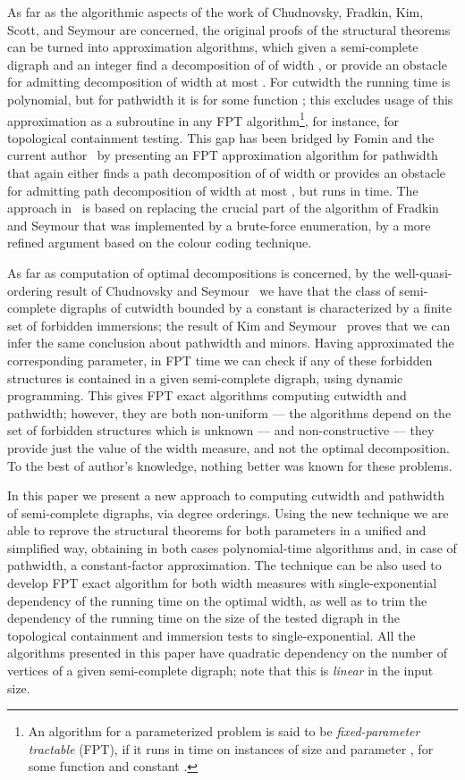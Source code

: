 \documentclass[a4paper,10pt]{article}
\begin{document}
As far as the algorithmic aspects of the work of Chudnovsky, Fradkin, Kim, Scott, and Seymour are concerned, the original proofs of the structural theorems can be turned into approximation algorithms, which given a semi-complete digraph  and an integer  find a decomposition of  of width , or provide an obstacle for admitting decomposition of width at most . For cutwidth the running time is polynomial, but for pathwidth it is  for some function ; this excludes usage of this approximation as a subroutine in any FPT algorithm\footnote{An algorithm for a parameterized problem is said to be {\em{fixed-parameter tractable}} (FPT), if it runs in time  on instances of size  and parameter , for some function  and constant .}, for instance, for topological containment testing. This gap has been bridged by Fomin and the current author~\cite{my} by presenting an FPT approximation algorithm for pathwidth that again either finds a path decomposition of  of width  or provides an obstacle for admitting path decomposition of width at most , but runs in  time. The approach in~\cite{my} is based on replacing the crucial part of the algorithm of Fradkin and Seymour that was implemented by a brute-force enumeration, by a more refined argument based on the colour coding technique.

As far as computation of optimal decompositions is concerned, by the well-quasi-ordering result of Chudnovsky and Seymour~\cite{ChudnovskyS11} we have that the class of semi-complete digraphs of cutwidth bounded by a constant is characterized by a finite set of forbidden immersions; the result of Kim and Seymour~\cite{kim-seymour-minors} proves that we can infer the same conclusion about pathwidth and minors. Having approximated the corresponding parameter, in FPT time we can check if any of these forbidden structures is contained in a given semi-complete digraph, using dynamic programming. This gives FPT exact algorithms computing cutwidth and pathwidth; however, they are both non-uniform ---  the algorithms depend on the set of forbidden structures which is unknown --- and non-constructive --- they provide just the value of the width measure, and not the optimal decomposition. To the best of author's knowledge, nothing better was known for these problems.

\vskip 0.15cm

 In this paper we present a new approach to computing cutwidth and pathwidth of semi-complete digraphs, via degree orderings. Using the new technique we are able to reprove the structural theorems for both parameters in a unified and simplified way, obtaining in both cases polynomial-time algorithms and, in case of pathwidth, a constant-factor approximation. The technique can be also used to develop FPT exact algorithm for both width measures with single-exponential dependency of the running time on the optimal width, as well as to trim the dependency of the running time on the size of the tested digraph in the topological containment and immersion tests to single-exponential. All the algorithms presented in this paper have quadratic dependency on the number of vertices of a given semi-complete digraph; note that this is {\em{linear}} in the input size. 
\end{document}
